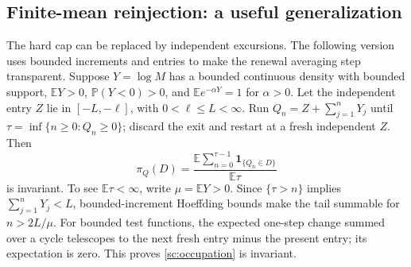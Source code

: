 \subsection{Finite-mean reinjection: a useful generalization}
The hard cap can be replaced by independent excursions. The following
version uses bounded increments and entries to make the renewal averaging
step transparent. Suppose \(Y=\log M\) has a bounded continuous density
with bounded support, \(\mathbb EY>0\), \(\mathbb P(Y<0)>0\), and
\(\mathbb E e^{-\alpha Y}=1\) for \(\alpha>0\). Let the independent
entry \(Z\) lie in \([-L,-\ell]\), with \(0<\ell\le L<\infty\).
Run \(Q_n=Z+\sum_{j=1}^nY_j\) until
\(\tau=\inf\{n\ge0:Q_n\ge0\}\); discard the exit and restart at a
fresh independent \(Z\). Then
\begin{equation}
 \pi_Q(D)=\frac{\mathbb E\sum_{n=0}^{\tau-1}
                  \mathbf1_{\{Q_n\in D\}}}{\mathbb E\tau}
 \label{sc:occupation}
\end{equation}
is invariant. To see \(\mathbb E\tau<\infty\), write
\(\mu=\mathbb EY>0\). Since \(\{\tau>n\}\) implies
\(\sum_{j=1}^nY_j<L\), bounded-increment Hoeffding bounds make the
tail summable for \(n>2L/\mu\).
For bounded test functions, the expected one-step change summed over a
cycle telescopes to the next fresh entry minus the present entry; its
expectation is zero. This proves \eqref{sc:occupation} is invariant.

